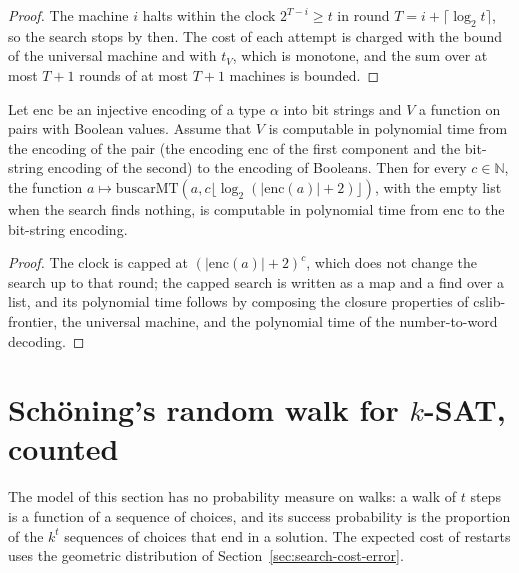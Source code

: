\begin{proof}
  \leanok
  The machine $i$ halts within the clock $2^{T-i} \ge t$ in round $T = i + \lceil \log_2 t \rceil$,
  so the search stops by then. The cost of each attempt is charged with the bound of the universal
  machine and with $t_V$, which is monotone, and the sum over at most $T + 1$ rounds of at most $T + 1$
  machines is bounded.
\end{proof}

\begin{theorem}
  \label{thm:search-buscarmt-poly}
  \leanok
  Let $\mathrm{enc}$ be an injective encoding of a type $\alpha$ into bit strings and $V$ a function
  on pairs with Boolean values. Assume that $V$ is computable in polynomial time from the
  encoding of the pair (the encoding $\mathrm{enc}$ of the first component and the bit-string
  encoding of the second) to the encoding of Booleans. Then for every $c \in \mathbb{N}$, the
  function $a \mapsto \mathrm{buscarMT}(a, c \lfloor \log_2 (|\mathrm{enc}(a)| + 2) \rfloor)$, with the
  empty list when the search finds nothing, is computable in polynomial time from $\mathrm{enc}$ to the
  bit-string encoding.
  \own{}
\end{theorem}

\begin{proof}
  \leanok
  The clock is capped at $(|\mathrm{enc}(a)| + 2)^c$, which does not change the search up to that
  round; the capped search is written as a map and a find over a list, and its polynomial time
  follows by composing the closure properties of cslib-frontier, the universal machine, and the
  polynomial time of the number-to-word decoding.
\end{proof}

\section{Sch\"oning's random walk for $k$-SAT, counted}
\label{sec:search-schoening}

The model of this section has no probability measure on walks: a walk of $t$ steps is a function of
a sequence of choices, and its success probability is the proportion of the $k^t$ sequences of
choices that end in a solution. The expected cost of restarts uses the geometric distribution of
Section~\ref{sec:search-cost-error}.

